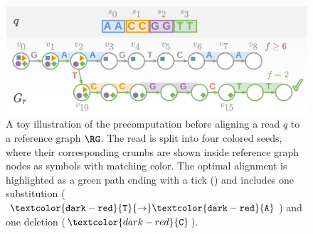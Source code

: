 \begin{figure}[t]
    \centering
	\includegraphics[width=0.8\linewidth]{figures/seed-heuristic-diagram.png}
	\caption[Seed heuristic precomputation: seeds, crumbs, matches]{%
		A toy illustration of the \seedh precomputation before aligning a read
		$q$ to a reference graph $\RG$. The read is split into four colored
		seeds, where their corresponding crumbs are shown inside reference graph
		nodes as symbols with matching color. The optimal alignment is
		highlighted as a green path ending with a tick (\protect\greentick{})
		and includes one substitution
		($\mathtt{\textcolor{dark-red}{T}{\rightarrow}\textcolor{dark-red}{A}}$)
		and one deletion ($\textcolor{dark-red}{\mathtt{C}}$).
	}
\label{SEEDfig:overview}
\end{figure}